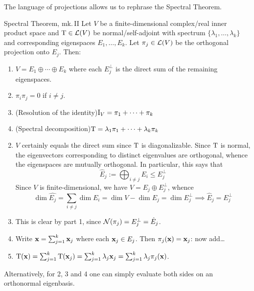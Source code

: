 The language of projections allows us to rephrase the Spectral Theorem.
  
\begin{thm}{Spectral Theorem, mk.\,II}{}
	Let $V$ be a finite-dimensional complex/real inner product space and $\mathrm{T}\in\mathcal{L}(V)$ be normal/self-adjoint with spectrum $\{\lambda_1,\ldots,\lambda_k\}$ and corresponding eigenspaces $E_1,\ldots,E_k$. Let $\pi_j\in\mathcal{L}(V)$ be the orthogonal projection onto $E_j$. Then:
	\begin{enumerate}
	  \item $V=E_1\oplus \cdots\oplus E_k$ where each $E_j^\perp$ is the direct sum of the remaining eigenspaces.
	  \item $\pi_i\pi_j=0$ if $i\neq j$.
	  \item (Resolution of the identity)\quad $\mathrm{I}_V=\pi_1+\cdots+\pi_k$
	  \item (Spectral decomposition)\quad $\mathrm{T}=\lambda_1\pi_1+\cdots+\lambda_k\pi_k$
	\end{enumerate}
\end{thm}

\begin{tcolorbox}[proofstyle]
	\begin{enumerate}\setcounter{enumi}{1}
	  \item[\emph{Proof}. 1.] $V$ certainly equals the direct sum since $\mathrm{T}$ is diagonalizable. Since $\mathrm{T}$ is normal, the eigenvectors corresponding to distinct eigenvalues are orthogonal, whence the eigenspaces are mutually orthogonal. In particular, this says that
	  \[
	  	\hat E_j:=\bigoplus_{i\neq j}E_i\le E_j^\perp
	  \]
	  Since $V$ is finite-dimensional, we have $V=E_j\oplus E_j^\perp$, whence
	  \[
	  	\dim \hat{E_j}=\sum\limits_{i\neq j}\dim E_i
	  	=\dim V-\dim E_j=\dim E_j^\perp 
	  	\implies \hat E_j=E_j^\perp
	  \]
	  \item This is clear by part 1, since $\mathcal{N}(\pi_j)=E_j^\perp=\hat E_j$.
	  \item Write ${\mathbf{x}}=\sum_{j=1}^k{\mathbf{x}}_j$ where each ${\mathbf{x}}_j\in E_j$. Then $\pi_j({\mathbf{x}})={\mathbf{x}}_j$: now add\ldots
	  \item $\mathrm{T}({\mathbf{x}})=\sum_{j=1}^k\mathrm{T}({\mathbf{x}}_j)=\sum_{j=1}^k\lambda_j{\mathbf{x}}_j=\sum_{j=1}^k\lambda_j\pi_j({\mathbf{x}})$.
	\end{enumerate}
	Alternatively, for 2, 3 and 4 one can simply evaluate both sides on an orthonormal eigenbasis.\hfill\qedsymbol
\end{tcolorbox}


